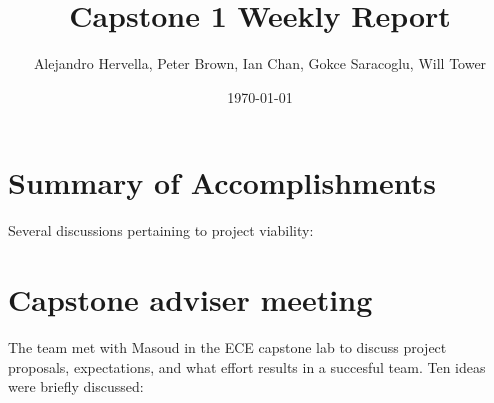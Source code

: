 \documentclass[11pt]{article}
\author{Alejandro Hervella, Peter Brown, Ian Chan, Gokce Saracoglu, Will Tower}
\date{\today}
\title{Capstone 1 Weekly Report}
\begin{document}
\maketitle
\tableofcontents


\section{Summary of Accomplishments}
\label{sec:orgf4c217c}

Several discussions pertaining to project viability:

\section{Capstone adviser meeting}
\label{sec:org0e64d2a}
The team met with Masoud in the ECE capstone lab to discuss project proposals, expectations, and what effort results in a succesful team. Ten ideas were briefly discussed:
\end{document}

